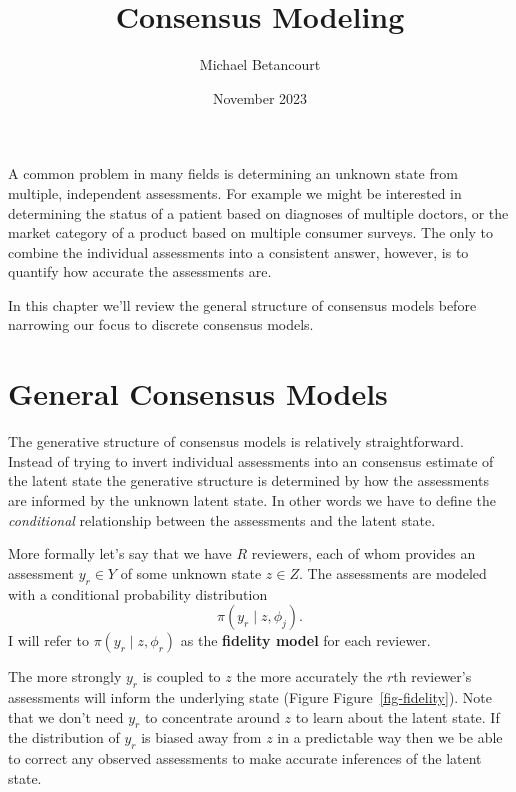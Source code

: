 \documentclass[
  letterpaper,
  DIV=11,
  numbers=noendperiod]{scrartcl}
\title{Consensus Modeling}
\author{Michael Betancourt}
\date{November 2023}
\renewcommand*\contentsname{Table of contents}
\newcommand\contentsname{Table of contents}
\begin{document}
\maketitle
\ifdefined\Shaded\renewenvironment{Shaded}{\begin{tcolorbox}[breakable, frame hidden, enhanced, sharp corners, boxrule=0pt, borderline west={3pt}{0pt}{shadecolor}, interior hidden]}{\end{tcolorbox}}\fi

\renewcommand*\contentsname{Table of contents}
{
\hypersetup{linkcolor=}
\setcounter{tocdepth}{3}
\tableofcontents
}
A common problem in many fields is determining an unknown state from
multiple, independent assessments. For example we might be interested in
determining the status of a patient based on diagnoses of multiple
doctors, or the market category of a product based on multiple consumer
surveys. The only to combine the individual assessments into a
consistent answer, however, is to quantify how accurate the assessments
are.

In this chapter we'll review the general structure of consensus models
before narrowing our focus to discrete consensus models.

\hypertarget{general-consensus-models}{%
\section{General Consensus Models}\label{general-consensus-models}}

The generative structure of consensus models is relatively
straightforward. Instead of trying to invert individual assessments into
an consensus estimate of the latent state the generative structure is
determined by how the assessments are informed by the unknown latent
state. In other words we have to define the \emph{conditional}
relationship between the assessments and the latent state.

More formally let's say that we have \(R\) reviewers, each of whom
provides an assessment \(y_{r} \in Y\) of some unknown state
\(z \in Z\). The assessments are modeled with a conditional probability
distribution \[
\pi( y_{r} \mid z, \phi_{j} ).
\] I will refer to \(\pi( y_{r} \mid z, \phi_{r} )\) as the
\textbf{fidelity model} for each reviewer.

The more strongly \(y_{r}\) is coupled to \(z\) the more accurately the
\(r\)th reviewer's assessments will inform the underlying state (Figure
Figure~\ref{fig-fidelity}). Note that we don't need \(y_{r}\) to
concentrate around \(z\) to learn about the latent state. If the
distribution of \(y_{r}\) is biased away from \(z\) in a predictable way
then we be able to correct any observed assessments to make accurate
inferences of the latent state.
\end{document}
